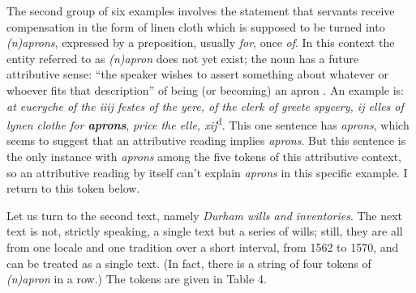 \documentclass[output=paper,
modfonts
]{LSP/langsci}
\begin{document}
The second group of six examples involves the statement that servants
receive compensation in the form of linen cloth which is supposed to be
turned into \emph{(n)aprons}, expressed by a preposition, usually
\emph{for}, once \emph{of}. In this context the entity referred to as
\emph{(n)apron} does not yet exist; the noun has a future attributive
sense: ``the speaker wishes to assert something about whatever or
whoever fits that description'' of being (or becoming) an apron
\citep[285]{DON}. An example is: \emph{at eueryche of the iiij
festes of the yere, of the clerk of greete spycery, ij elles of lynen
clothe for \textbf{aprons}}, \emph{price the elle,
xij}\textsuperscript{d}. This one sentence has \emph{aprons}, which
seems to suggest that an attributive reading implies \emph{aprons}. But
this sentence is the only instance with \emph{aprons} among the five
tokens of this attributive context, so an attributive reading by itself
can't explain \emph{aprons} in this specific example. I return to this
token below.

Let us turn to the second text, namely \emph{Durham wills and inventories}. The next text is not, strictly speaking,
a single text but a series of wills; still, they are all from one locale
and one tradition over a short interval, from 1562 to 1570, and can be
treated as a single text. (In fact, there is a string of four tokens of
\emph{(n)apron} in a row.) The tokens are given in Table 4.
\end{document}
